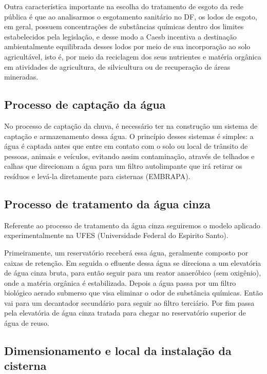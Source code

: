	Outra característica importante na escolha do tratamento de esgoto da rede pública é que ao analisarmos o esgotamento sanitário no DF, os lodos de esgoto, em geral, possuem concentrações de substâncias químicas dentro dos limites estabelecidos pela legislação, e desse modo a Caesb incentiva a destinação ambientalmente equilibrada desses lodos por meio de sua incorporação ao solo agricultável, isto é, por meio da reciclagem dos seus nutrientes e matéria orgânica em atividades de agricultura, de silvicultura ou de recuperação de áreas mineradas.

\subsection{Processo de captação da água}

	No processo de captação da chuva, é necessário ter na construção um sistema de captação e armazenamento dessa água. O princípio desses sistemas é simples: a água é captada antes que entre em contato com o solo ou local de trânsito de pessoas, animais e veículos, evitando assim contaminação, através de telhados e calhas que direcionam a água para um filtro autolimpante que irá retirar os resíduos e levá-la diretamente para cisternas (EMBRAPA).


\subsection{Processo de tratamento da água cinza}

	Referente ao processo de tratamento da água cinza seguiremos o modelo aplicado experimentalmente na UFES (Universidade Federal do Espirito Santo).

	Primeiramente, um reservatório receberá essa água, geralmente composto por caixas de retenção. Em seguida o efluente dessa água se direciona a um elevatória de água cinza bruta, para então seguir para um reator anaeróbico (sem oxigênio), onde a matéria orgânica é estabilizada. Depois a água passa por um filtro biológico aerado submerso que visa eliminar o odor de substância químicas. Então vai para um decantador secundário para seguir ao filtro terciário. Por fim passa pela elevatória de água cinza tratada para chegar no reservatório superior de água de reuso.

\subsection{Dimensionamento e local da instalação da cisterna}

